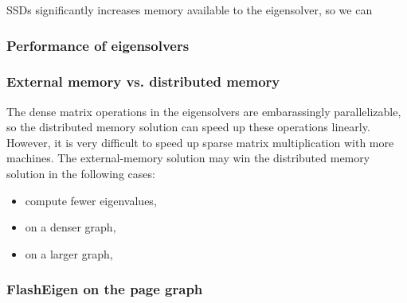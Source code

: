 SSDs significantly increases memory available to the eigensolver, so we can

\subsubsection{Performance of eigensolvers}





\subsubsection{External memory vs. distributed memory}

The dense matrix operations in the eigensolvers are embarassingly parallelizable,
so the distributed memory solution can speed up these operations linearly.
However, it is very difficult to speed up sparse matrix multiplication with
more machines.
The external-memory solution may win the distributed memory solution
in the following cases:

\begin{itemize} \itemsep1pt \parskip0pt 
	\item compute fewer eigenvalues,
	\item on a denser graph,
	\item on a larger graph,
\end{itemize}

\subsubsection{FlashEigen on the page graph}
